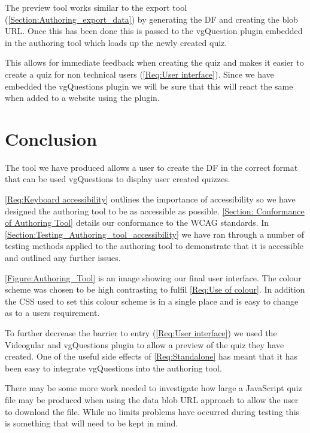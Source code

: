 The preview tool works similar to the export tool (\autoref{Section:Authoring_export_data}) by generating the \gls{DF} and creating the blob URL. Once this has been done this is passed to the vgQuestion plugin embedded in the authoring tool which loads up the newly created quiz.

This allows for immediate feedback when creating the quiz and makes it easier to create a quiz for non technical users (\cref{Req:User interface}). Since we have embedded the vgQuestions plugin we will be sure that this will react the same when added to a website using the plugin.

\section{Conclusion}
\label{Section:Authoring_Conclusion}

The tool we have produced allows a user to create the \gls{DF} in the correct format that can be used vgQuestions to display user created quizzes.

\cref{Req:Keyboard accessibility} outlines the importance of accessibility so we have designed the authoring tool to be as accessible as possible. \autoref{Section: Conformance of Authoring Tool} details our conformance to the \gls{WCAG} standards. In \autoref{Section:Testing_Authoring_tool_accessibility} we have ran through a number of testing methods applied to the authoring tool to demonstrate that it is accessible and outlined any further issues.

\autoref{Figure:Authoring_Tool} is an image showing our final user interface. The colour scheme was chosen to be high contrasting to fulfil \cref{Req:Use of colour}. In addition the CSS used to set this colour scheme is in a single place and is easy to change as to a users requirement.

To further decrease the barrier to entry (\cref{Req:User interface}) we used the \gls{Videogular} and \gls{vgQuestions} plugin to allow a preview of the quiz they have created. One of the useful side effects of \cref{Req:Standalone} has meant that it has been easy to integrate \gls{vgQuestions} into the authoring tool.

There may be some more work needed to investigate how large a JavaScript quiz file may be produced when using the data blob URL approach to allow the user to download the file. While no limits problems have occurred during testing this is something that will need to be kept in mind. 

